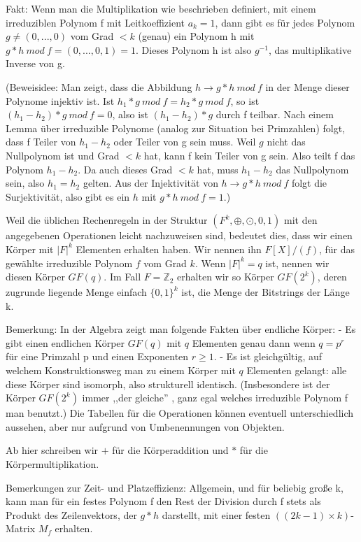 \documentclass[a4paper]{article}
\begin{document}
\begin{multicols}{3}
Fakt: Wenn man die Multiplikation wie beschrieben definiert, mit einem irreduziblen Polynom f mit Leitkoeffizient $a_k=1$, dann gibt es für jedes Polynom $g\not=(0,...,0)$ vom Grad $<k$ (genau) ein Polynom h mit $g*h\ mod\ f=(0,...,0,1)=1$. Dieses Polynom h ist also $g^{-1}$, das multiplikative Inverse von g.

(Beweisidee: Man zeigt, dass die Abbildung $h\rightarrow g*h\ mod\ f$ in der Menge dieser Polynome injektiv ist. Ist $h_1*g\ mod\ f=h_2*g\ mod\ f$, so ist $(h_1-h_2)*g\ mod\ f= 0$, also ist $(h_1-h_2)*g$ durch f teilbar. Nach einem Lemma über irreduzible Polynome (analog zur Situation bei Primzahlen) folgt, dass f Teiler von $h_1-h_2$ oder Teiler von g sein muss. Weil $g$ nicht das Nullpolynom ist und Grad $<k$ hat, kann f kein Teiler von g sein. Also teilt f das Polynom $h_1-h_2$. Da auch dieses Grad $<k$ hat, muss $h_1-h_2$ das Nullpolynom sein, also $h_1=h_2$ gelten. Aus der Injektivität von $h\rightarrow g*h\ mod\ f$ folgt die Surjektivität, also gibt es ein $h$ mit $g*h\ mod\ f=1$.)

Weil die üblichen Rechenregeln in der Struktur $(F^k,\oplus,\odot,0,1)$ mit den angegebenen Operationen leicht nachzuweisen sind, bedeutet dies, dass wir einen Körper mit $|F|^k$ Elementen erhalten haben. Wir nennen ihn $F[X]/(f)$, für das gewählte irreduzible Polynom $f$ vom Grad $k$. Wenn $|F|^k=q$ ist, nennen wir diesen Körper $GF(q)$. Im Fall $F=\mathbb{Z}_2$ erhalten wir so Körper $GF(2^k)$, deren zugrunde liegende Menge einfach $\{0,1\}^k$ ist, die Menge der Bitstrings der Länge k.

Bemerkung: In der Algebra zeigt man folgende Fakten über endliche Körper:
- Es gibt einen endlichen Körper $GF(q)$ mit $q$ Elementen genau dann wenn $q=p^r$ für eine Primzahl p und einen Exponenten $r\geq 1$.
- Es ist gleichgültig, auf welchem Konstruktionsweg man zu einem Körper mit $q$ Elementen gelangt: alle diese Körper sind isomorph, also strukturell identisch. (Insbesondere ist der Körper $GF(2^k)$ immer ,,der gleiche'' , ganz egal welches irreduzible Polynom f man benutzt.) Die Tabellen für die Operationen können eventuell unterschiedlich aussehen, aber nur aufgrund von Umbenennungen von Objekten.

Ab hier schreiben wir $+$ für die Körperaddition und $*$ für die Körpermultiplikation.

Bemerkungen zur Zeit- und Platzeffizienz: Allgemein, und für beliebig große k, kann man für ein festes Polynom f den Rest der Division durch f stets als Produkt des Zeilenvektors, der $g*h$ darstellt, mit einer festen $((2k-1)\times k)$-Matrix $M_f$ erhalten.


\end{multicols}
\end{document}

